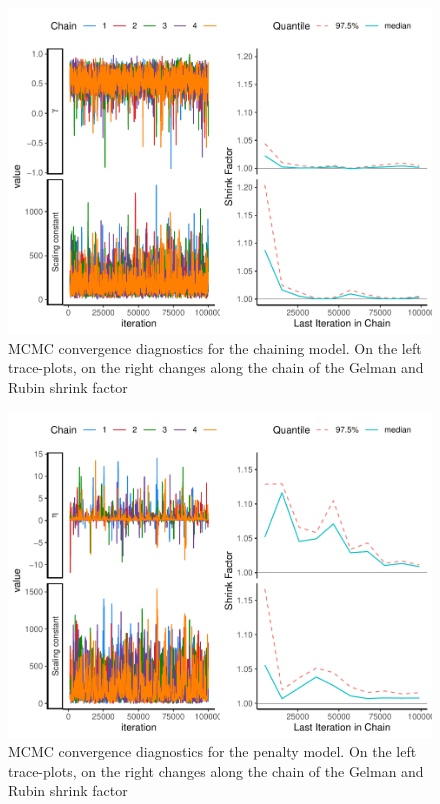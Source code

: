 \documentclass[
  12pt,
]{article}
\begin{document}
\begin{figure}
\includegraphics[width=1\linewidth]{manuscript_BE_files/figure-latex/diaggam-1} \caption{MCMC convergence diagnostics for the chaining model. On the left trace-plots, on the right changes along the chain of the Gelman and Rubin shrink factor }\label{fig:diaggam}
\end{figure}

\begin{figure}
\includegraphics[width=1\linewidth]{manuscript_BE_files/figure-latex/diagNeg-1} \caption{MCMC convergence diagnostics for the penalty model. On the left trace-plots, on the right changes along the chain of the Gelman and Rubin shrink factor}\label{fig:diagNeg}
\end{figure}
\end{document}
